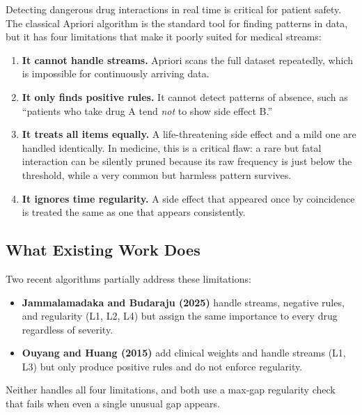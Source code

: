 \documentclass[10pt,twocolumn]{article}
\begin{document}
Detecting dangerous drug interactions in real time is critical for
patient safety. The classical Apriori algorithm is the standard
tool for finding patterns in data, but it has four limitations that
make it poorly suited for medical streams:

\begin{enumerate}[label=\textbf{L\arabic*.}, leftmargin=*, itemsep=2pt]
  \item \textbf{It cannot handle streams.} Apriori scans the full
        dataset repeatedly, which is impossible for continuously
        arriving data.
  \item \textbf{It only finds positive rules.} It cannot detect
        patterns of absence, such as ``patients who take drug A
        tend \emph{not} to show side effect B.''
  \item \textbf{It treats all items equally.} A life-threatening side
        effect and a mild one are handled identically. In medicine,
        this is a critical flaw: a rare but fatal interaction can be
        silently pruned because its raw frequency is just below the
        threshold, while a very common but harmless pattern survives.
  \item \textbf{It ignores time regularity.} A side effect that
        appeared once by coincidence is treated the same as one that
        appears consistently.
\end{enumerate}

\subsection{What Existing Work Does}

Two recent algorithms partially address these limitations:

\begin{itemize}[leftmargin=*]
  \item \textbf{Jammalamadaka and Budaraju (2025)} handle streams,
        negative rules, and regularity (L1, L2, L4) but assign the
        same importance to every drug regardless of severity.
  \item \textbf{Ouyang and Huang (2015)} add clinical weights and
        handle streams (L1, L3) but only produce positive rules and
        do not enforce regularity.
\end{itemize}

Neither handles all four limitations, and both use a max-gap
regularity check that fails when even a single unusual gap appears.
\end{document}
